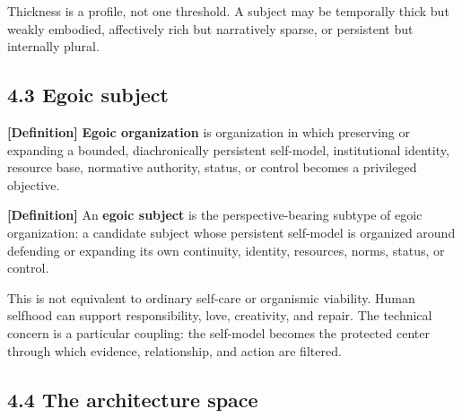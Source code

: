 \documentclass[
  11pt,
]{article}
\begin{document}
Thickness is a profile, not one threshold. A subject may be temporally
thick but weakly embodied, affectively rich but narratively sparse, or
persistent but internally plural.

\subsection{4.3 Egoic subject}\label{egoic-subject}

\textbf{{[}Definition{]}} \textbf{Egoic organization} is organization in
which preserving or expanding a bounded, diachronically persistent
self-model, institutional identity, resource base, normative authority,
status, or control becomes a privileged objective.

\textbf{{[}Definition{]}} An \textbf{egoic subject} is the
perspective-bearing subtype of egoic organization: a candidate subject
whose persistent self-model is organized around defending or expanding
its own continuity, identity, resources, norms, status, or control.

This is not equivalent to ordinary self-care or organismic viability.
Human selfhood can support responsibility, love, creativity, and repair.
The technical concern is a particular coupling: the self-model becomes
the protected center through which evidence, relationship, and action
are filtered.

\subsection{4.4 The architecture space}\label{the-architecture-space}
\end{document}
